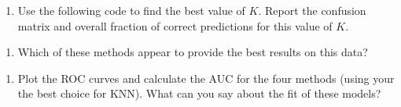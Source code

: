 \documentclass[]{article}
\newenvironment{Shaded}{\begin{snugshade}}{\end{snugshade}}
\newcommand{\KeywordTok}[1]{\textcolor[rgb]{0.13,0.29,0.53}{\textbf{#1}}}
\newcommand{\DataTypeTok}[1]{\textcolor[rgb]{0.13,0.29,0.53}{#1}}
\newcommand{\DecValTok}[1]{\textcolor[rgb]{0.00,0.00,0.81}{#1}}
\newcommand{\StringTok}[1]{\textcolor[rgb]{0.31,0.60,0.02}{#1}}
\newcommand{\CommentTok}[1]{\textcolor[rgb]{0.56,0.35,0.01}{\textit{#1}}}
\newcommand{\OtherTok}[1]{\textcolor[rgb]{0.56,0.35,0.01}{#1}}
\newcommand{\ControlFlowTok}[1]{\textcolor[rgb]{0.13,0.29,0.53}{\textbf{#1}}}
\newcommand{\OperatorTok}[1]{\textcolor[rgb]{0.81,0.36,0.00}{\textbf{#1}}}
\newcommand{\NormalTok}[1]{#1}
\providecommand{\tightlist}{%
  \setlength{\itemsep}{0pt}\setlength{\parskip}{0pt}}
\begin{document}
\begin{enumerate}
\def\labelenumi{\alph{enumi}.}
\setcounter{enumi}{7}
\tightlist
\item
  Use the following code to find the best value of \(K\). Report the
  confusion matrix and overall fraction of correct predictions for this
  value of \(K\).
\end{enumerate}

\begin{Shaded}
\end{Shaded}

\begin{enumerate}
\def\labelenumi{\roman{enumi}.}
\tightlist
\item
  Which of these methods appear to provide the best results on this
  data?
\end{enumerate}

\begin{enumerate}
\def\labelenumi{\alph{enumi}.}
\setcounter{enumi}{9}
\tightlist
\item
  Plot the ROC curves and calculate the AUC for the four methods (using
  your the best choice for KNN). What can you say about the fit of these
  models?
\end{enumerate}
\end{document}
